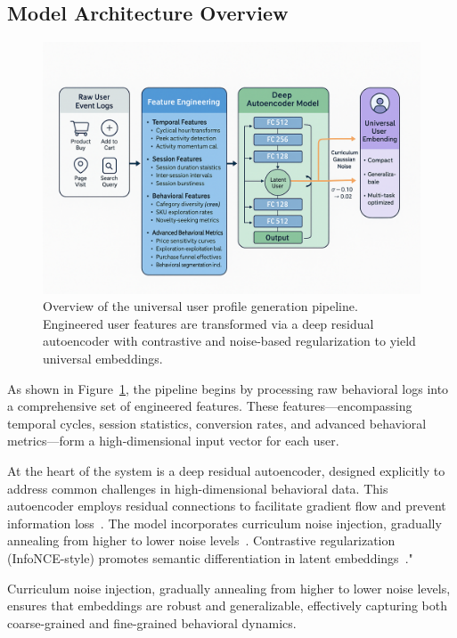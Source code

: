 \documentclass[sigconf]{acmart}
\begin{document}
\subsection{Model Architecture Overview}
\begin{figure}[t]
  \centering
  \includegraphics[width=0.9\linewidth]{high.png}
  \caption{Overview of the universal user profile generation pipeline. Engineered user features are transformed via a deep residual autoencoder with contrastive and noise-based regularization to yield universal embeddings.}
  \label{fig:architecture}
\end{figure}

As shown in Figure~\ref{fig:architecture}, the pipeline begins by processing raw behavioral logs into a comprehensive set of engineered features. These features—encompassing temporal cycles, session statistics, conversion rates, and advanced behavioral metrics—form a high-dimensional input vector for each user.

At the heart of the system is a deep residual autoencoder, designed explicitly to address common challenges in high-dimensional behavioral data. This autoencoder employs residual connections to facilitate gradient flow and prevent information loss~\cite{He2016ResNet,Mao2016}. The model incorporates curriculum noise injection, gradually annealing from higher to lower noise levels~\cite{Bengio2009Curriculum,Sajjadi2016NoiseAnneal}. Contrastive regularization (InfoNCE-style) promotes semantic differentiation in latent embeddings~\cite{Oord2018,Zhou2020S3Rec}."

Curriculum noise injection, gradually annealing from higher to lower noise levels, ensures that embeddings are robust and generalizable, effectively capturing both coarse-grained and fine-grained behavioral dynamics.
\end{document}
